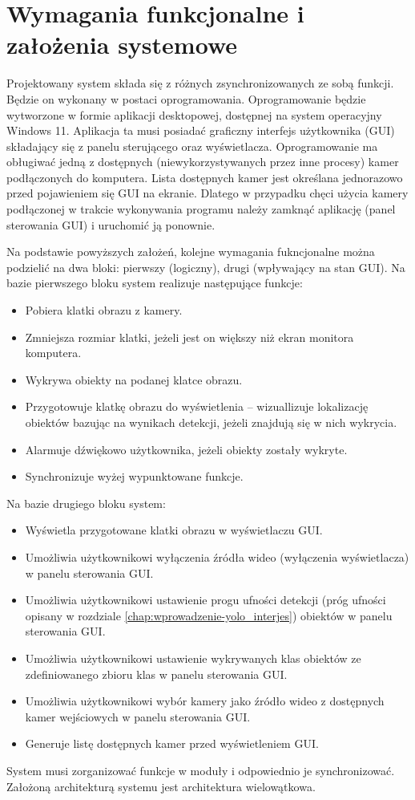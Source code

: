 \section{Wymagania funkcjonalne i założenia systemowe}
\label{chap:wymagania-funcjonalne}
Projektowany system składa się z różnych zsynchronizowanych ze sobą funkcji. Będzie on wykonany w postaci oprogramowania. 
Oprogramowanie będzie wytworzone w formie aplikacji desktopowej, dostępnej na system operacyjny Windows 11. Aplikacja ta musi posiadać graficzny interfejs użytkownika (GUI) składający się z panelu sterującego oraz wyświetlacza. 
Oprogramowanie ma obługiwać jedną z dostępnych (niewykorzystywanych przez inne procesy) kamer podłączonych do komputera. Lista dostępnych kamer jest określana jednorazowo przed pojawieniem się GUI na ekranie. Dlatego w przypadku chęci użycia kamery podłączonej w trakcie wykonywania programu należy zamknąć aplikację (panel sterowania GUI) i uruchomić ją ponownie.

Na podstawie powyższych założeń, kolejne wymagania fukncjonalne można podzielić na dwa bloki: pierwszy (logiczny), drugi (wpływający na stan GUI). Na bazie pierwszego bloku system realizuje następujące funkcje:
\begin{itemize}
    \item Pobiera klatki obrazu z kamery.
    \item Zmniejsza rozmiar klatki, jeżeli jest on większy niż ekran monitora komputera.
    \item Wykrywa obiekty na podanej klatce obrazu.
    \item Przygotowuje klatkę obrazu do wyświetlenia -- wizuallizuje lokalizację obiektów bazując na wynikach detekcji, jeżeli znajdują się w nich wykrycia.
    \item Alarmuje dźwiękowo użytkownika, jeżeli obiekty zostały wykryte.
    \item Synchronizuje wyżej wypunktowane funkcje.
\end{itemize}

Na bazie drugiego bloku system:
\begin{itemize}
        \item Wyświetla przygotowane klatki obrazu w wyświetlaczu GUI.
        \item Umożliwia użytkownikowi wyłączenia źródła wideo (wyłączenia wyświetlacza) w panelu sterowania GUI.
        \item Umożliwia użytkownikowi ustawienie progu ufności detekcji (próg ufności opisany w rozdziale \ref{chap:wprowadzenie-yolo_interjes}) obiektów w panelu sterowania GUI.
        \item Umożliwia użytkownikowi ustawienie wykrywanych klas obiektów ze zdefiniowanego zbioru klas w panelu sterowania GUI.
        \item Umożliwia użytkownikowi wybór kamery jako źródło wideo z dostępnych kamer wejściowych w panelu sterowania GUI.
        \item Generuje listę dostępnych kamer przed wyświetleniem GUI.
\end{itemize}

System musi zorganizować funkcje w moduły i odpowiednio je synchronizować. Założoną architekturą systemu jest architektura wielowątkowa. 